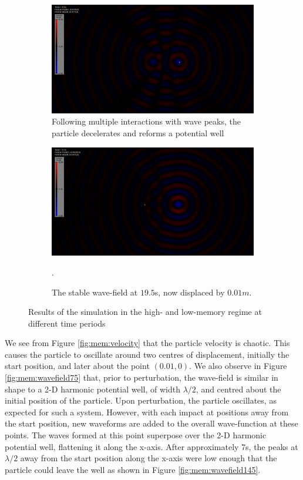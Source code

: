 \begin{figure}
	\begin{subfigure}{0.475\textwidth}
		\includegraphics[width=\textwidth]{simulation/highmemory/wavefield165.png}
		\caption{Following multiple interactions with wave peaks, the particle decelerates and reforms a potential well}
		\label{fig:mem:wavefield165}
	\end{subfigure}
	\hfill
	\begin{subfigure}{0.475\textwidth}
		\includegraphics[width=\textwidth]{simulation/highmemory/wavefield195.png}
		\caption{The stable wave-field at $19.5$s, now displaced by $0.01m$.}
		\label{fig:mem:wavefield195}.
	\end{subfigure}
\caption{Results of the simulation in the high- and low-memory regime at different time periods}
\label{fig:memory}
\end{figure}

We see from Figure \ref{fig:mem:velocity} that the particle velocity is chaotic. This causes the particle to oscillate around two centres of displacement, initially the start position, and later about the point $(0.01,0)$. We also observe in Figure \ref{fig:mem:wavefield75} that, prior to perturbation, the wave-field is similar in shape to a 2-D harmonic potential well, of width $\lambda/2$, and centred about the initial position of the particle. Upon perturbation, the particle oscillates, as expected for such a system. However, with each impact at positions away from the start position, new waveforms are added to the overall wave-function at these points. The waves formed at this point superpose over the 2-D harmonic potential well, flattening it along the x-axis. After approximately 7s, the peaks at $\lambda/2$ away from the start position along the x-axis were low enough that the particle could leave the well as shown in Figure \ref{fig:mem:wavefield145}.

